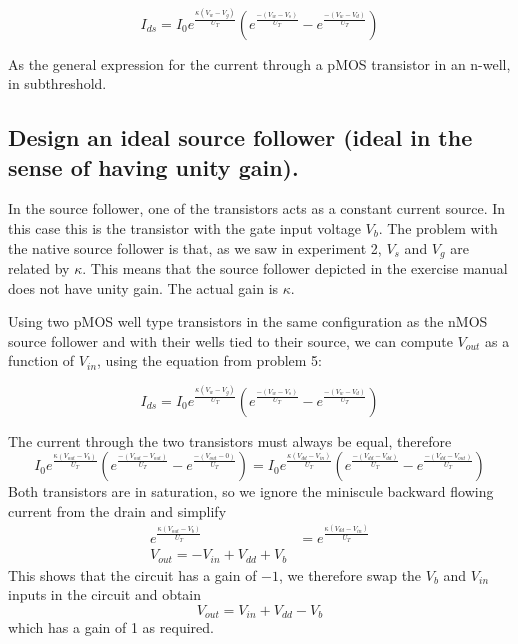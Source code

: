 \begin{equation*}
    I_{ds} = I_0e^{\frac{\kappa(V_w - V_g)}{U_T}}\left(e^{\frac{-(V_w -V_s)}{U_T}}-e^{\frac{-(V_w - V_d)}{U_T}}\right)
\end{equation*}

As the general expression for the current through a pMOS transistor in an n-well, in subthreshold.

\subsection{Design an ideal source follower (ideal in the sense of having unity gain).}
In the source follower, one of the transistors acts as a constant current source. In this case this is the transistor
with the gate input voltage \(V_b\). The problem with the native source follower is that, as we saw in experiment 2,
\(V_s\) and \(V_g\) are related by \(\kappa\). This means that the source follower depicted in the exercise manual 
does not have unity gain. The actual gain is \(\kappa\).

Using two pMOS well type transistors in the same configuration as the nMOS source follower and  with their wells tied to their source,
we can compute \(V_{out}\) as a function of \(V_{in}\), using the equation from problem 5:

\begin{equation*}
    I_{ds} = I_0e^{\frac{\kappa(V_w - V_g)}{U_T}}\left(e^{\frac{-(V_w -V_s)}{U_T}}-e^{\frac{-(V_w - V_d)}{U_T}}\right)
\end{equation*}

The current through the two transistors must always be equal, therefore
\begin{equation*}
    I_0e^{\frac{\kappa(V_{out} - V_{b})}{U_T}}\left(e^{\frac{-(V_{out} -V_{out})}{U_T}}-e^{\frac{-(V_{out} - 0)}{U_T}}\right) = I_0e^{\frac{\kappa(V_{dd} - V_{in})}{U_T}}\left(e^{\frac{-(V_{dd}-V_{dd})}{U_T}}-e^{\frac{-(V_{dd} - V_{out})}{U_T}}\right)
\end{equation*}
Both transistors are in saturation, so we ignore the miniscule backward flowing current from the drain and simplify
\begin{align*}
    e^{\frac{\kappa(V_{out} - V_{b})}{U_T}} &= e^{\frac{\kappa(V_{dd} - V_{in})}{U_T}} \\
    V_{out} = -V_{in} +V_{dd} + V_{b}
\end{align*}
This shows that the circuit has a gain of \(-1\), we therefore swap the \(V_b\) and \(V_{in}\) inputs in the circuit
and obtain
\begin{equation*}
    V_{out} = V_{in} +V_{dd} - V_{b}
\end{equation*}
which has a gain of 1 as required.

